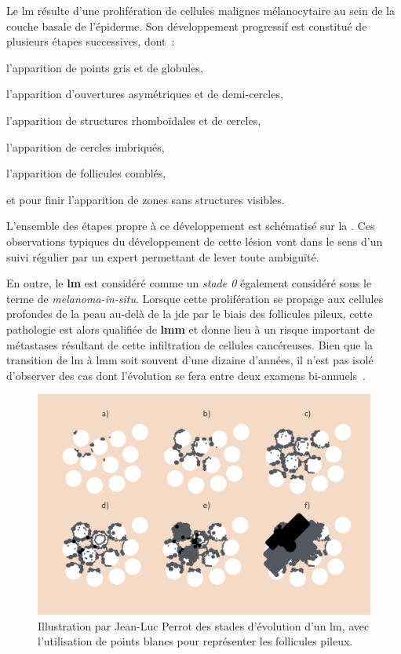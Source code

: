 Le \gls{lm} résulte d'une prolifération de cellules malignes mélanocytaire au sein de la couche basale de l'épiderme. Son développement progressif est constitué de plusieurs étapes successives, dont~:
\begin{inlinerate}[label=(\alph*)]
    \item l'apparition de points gris et de globules,
    \item l'apparition d'ouvertures asymétriques et de demi-cercles,
    \item l'apparition de structures rhomboïdales et de cercles,
    \item l'apparition de cercles imbriqués,
    \item l'apparition de follicules comblés,
    \item et pour finir l'apparition de zones sans structures visibles.
\end{inlinerate} 
L'ensemble des étapes propre à ce développement est schématisé sur la . Ces observations typiques du développement de cette lésion vont dans le sens d'un suivi régulier par un expert permettant de lever toute ambiguïté.\par

En outre, le \textbf{\gls{lm}} est considéré comme un \textit{stade 0} également considéré sous le terme de \textit{melanoma-in-situ}. Lorsque cette prolifération se propage aux cellules profondes de la peau au-delà de la \gls{jde} par le biais des follicules pileux, cette pathologie est alors qualifiée de \textbf{\gls{lmm}} et donne lieu à un risque important de métastases résultant de cette infiltration de cellules cancéreuses. Bien que la transition de \gls{lm} à \gls{lmm} soit souvent d'une dizaine d'années, il n'est pas isolé d'observer des cas dont l'évolution se fera entre deux examens bi-annuels~\cite{Mckenna2006, LeGal2011}. 

\begin{figure}[H]
    \centering
    \includegraphics[width=\linewidth]{contents/chapter_1/resources/illustration_surface_progression.pdf}
    \caption{Illustration par Jean-Luc Perrot des stades d'évolution d'un \gls{lm}, avec l'utilisation de points blancs pour représenter les follicules pileux.}
    \label{fig:illustration_surface_progression}
\end{figure}\par

